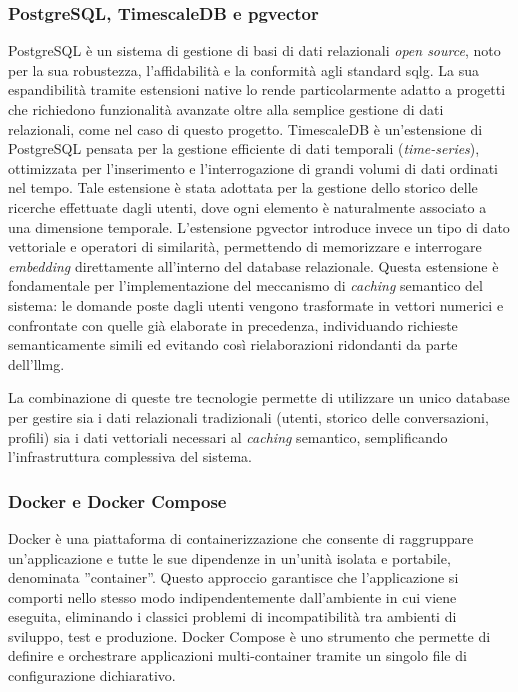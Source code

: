 \subsubsection{PostgreSQL, TimescaleDB e pgvector}
PostgreSQL è un sistema di gestione di basi di dati relazionali \textit{open source}, noto per la sua robustezza, 
l'affidabilità e la conformità agli standard \gls{sqlg}\glsfirstoccur . 
La sua espandibilità tramite estensioni native lo rende particolarmente adatto a progetti che richiedono funzionalità 
avanzate oltre alla semplice gestione di dati relazionali, come nel caso di questo progetto.
TimescaleDB è un'estensione di PostgreSQL pensata per la gestione efficiente di dati temporali (\textit{time-series}), 
ottimizzata per l'inserimento e l'interrogazione di grandi volumi di dati ordinati nel tempo. 
Tale estensione è stata adottata per la gestione dello storico delle ricerche effettuate dagli utenti, 
dove ogni elemento è naturalmente associato a una dimensione temporale.
L'estensione pgvector introduce invece un tipo di dato vettoriale e operatori di similarità, 
permettendo di memorizzare e interrogare \textit{embedding} direttamente all'interno del database relazionale. 
Questa estensione è fondamentale per l'implementazione del meccanismo di \textit{caching} semantico del sistema: 
le domande poste dagli utenti vengono trasformate in vettori numerici e confrontate con quelle già elaborate in precedenza, 
individuando richieste semanticamente simili ed evitando così rielaborazioni ridondanti da parte dell'\gls{llmg}.

La combinazione di queste tre tecnologie permette di utilizzare un unico database per gestire sia 
i dati relazionali tradizionali (utenti, storico delle conversazioni, profili) sia i dati vettoriali necessari al 
\textit{caching} semantico, semplificando l'infrastruttura complessiva del sistema.

\subsubsection{Docker e Docker Compose}
Docker è una piattaforma di containerizzazione che consente di raggruppare un'applicazione e tutte le sue dipendenze 
in un'unità isolata e portabile, denominata ''container''. 
Questo approccio garantisce che l'applicazione si comporti nello stesso modo indipendentemente dall'ambiente 
in cui viene eseguita, eliminando i classici problemi di incompatibilità tra ambienti di sviluppo, test e produzione.
Docker Compose è uno strumento che permette di definire e orchestrare applicazioni multi-container 
tramite un singolo file di configurazione dichiarativo. 

